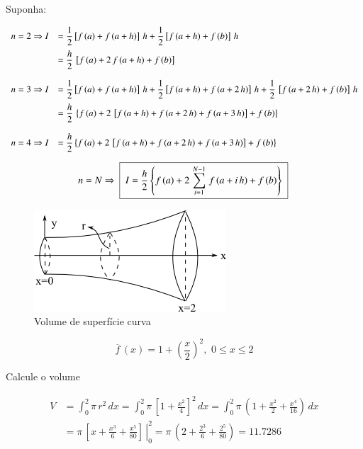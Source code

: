 Suponha:

\[
 \begin{array}{ll}
  n = 2 \Rightarrow I & = \displaystyle \frac{1}{2} \left[ f\,(a) + f\,(a + h) \right] \, h + \frac{1}{2} \left[ f\,(a + h) + f\,(b) \right] \, h \vspace*{0.2cm} \\
                      & = \displaystyle \frac{h}{2} \, \left[ f\,(a) + 2\,f\,(a + h) + f\,(b) \right] \\
  \\
  n = 3 \Rightarrow I & = \displaystyle \frac{1}{2} \left[ f\,(a) + f\,(a + h) \right] \, h + \frac{1}{2} \left[ f\,(a + h) + f\,(a + 2\,h) \right] \, h + \frac{1}{2} \, \left[ f\,(a + 2\,h) + f\,(b) \right] \, h \vspace*{0.2cm} \\
                      & = \displaystyle \frac{h}{2} \, \left\{ f\,(a) + 2\,\left[ f\,(a + h) + f\,(a + 2\,h) + f\,(a + 3\,h) \right] + f\,(b) \right\} \\
  \\
  n = 4 \Rightarrow I & = \displaystyle \frac{h}{2} \left\{ f\,(a) + 2\,\left[ f\,(a + h) + f\,(a + 2\,h) + f\,(a + 3\,h) \right] + f\,(b) \right\}
 \end{array}
\]

\begin{equation}
 \begin{array}{l}
  n = N \Rightarrow \mbox{ \framebox{ $ I = \displaystyle \frac{h}{2} \left\{ f\,(a) + 2\,\sum_{i=1}^{N-1} \, f\,(a + i\,h) + f\,(b) \right\} $ } }
 \end{array}
\end{equation}

\begin{example}

\begin{figure}[htb]
 \centering
 \includegraphics[scale=1.0]{capitulos/capitulo2/figuras/regra_trapezio3.png}
 \caption{Volume de superfície curva}
 \label{fig:regra_trapezio2}
\end{figure}

\[
 \overline{f}\,(x) = 1 + \left( \frac{x}{2} \right)^2, \, \, 0 \leq x \leq 2
\]

Calcule o volume

\[
 \begin{array}{ll}
  V & = \displaystyle \int_0^2 \pi \, r^2 \, dx = \int_0^2 \pi \, \left[ 1 + \frac{x^2}{4} \right]^2 \, dx = \int_0^2 \pi \, \left( 1 + \frac{x^2}{2} + \frac{x^4}{16} \right) \, dx \\
    & = \left. \pi \, \left[ x + \displaystyle \frac{x^3}{6} + \frac{x^5}{80} \right] \displaystyle \, \right|_0^2 = \pi \, \left(2 + \displaystyle \frac{2^3}{6} + \frac{2^5}{80}\right) = 11.7286
 \end{array}
\]

\end{example}